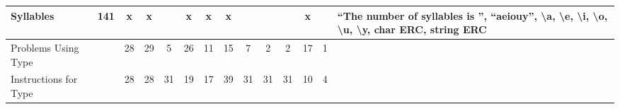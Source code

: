 \documentclass{sig-alternate}
\begin{document}
\begin{table*}[t]
\begin{tabular}{|>{\raggedright}p{3.1cm}|c|ccccccccccc|>{\raggedright}p{5.5cm}|}
\hline
Syllables                  & 141             & x    & x       &       & x       & x    & x      &                    &                  &                   & x     &            & ``The number of syllables is '', ``aeiouy'', \textbackslash a, \textbackslash e, \textbackslash i, \textbackslash o, \textbackslash u, \textbackslash y, char ERC, string ERC                                                   \tabularnewline
\hline
\hline
Problems Using Type                      &                 & 28   & 29      & 5     & 26      & 11   & 15     & 7                  & 2                & 2                 & 17    & 1          &                                                                                                                                                                                                                             \tabularnewline
\hline
Instructions for Type     &                 & 28   & 28      & 31    & 19      & 17   & 39     & 31                 & 31               & 31                & 10    & 4          &                                                                                                                                                                                                                             \tabularnewline
\hline
\end{tabular}
\end{table*}
\end{document}
